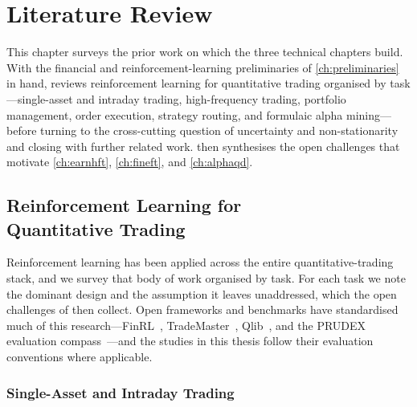 
\chapter{Literature Review} %
\label{ch:literature_review}

This chapter surveys the prior work on which the three technical chapters build. With the financial and reinforcement-learning preliminaries of \cref{ch:preliminaries} in hand,  reviews reinforcement learning for quantitative trading organised by task---single-asset and intraday trading, high-frequency trading, portfolio management, order execution, strategy routing, and formulaic alpha mining---before turning to the cross-cutting question of uncertainty and non-stationarity and closing with further related work.  then synthesises the open challenges that motivate \cref{ch:earnhft}, \cref{ch:fineft}, and \cref{ch:alphaqd}.

\section[Reinforcement Learning for Quantitative Trading]{Reinforcement Learning for\\Quantitative Trading}
\label{sec:bg_rl4qt}

Reinforcement learning has been applied across the entire quantitative-trading stack, and we survey that body of work organised by task. For each task we note the dominant design and the assumption it leaves unaddressed, which the open challenges of  then collect. Open frameworks and benchmarks have standardised much of this research---FinRL~\cite{liu2021finrl}, TradeMaster~\cite{sun2024trademaster}, Qlib~\cite{yang2020qlib}, and the PRUDEX evaluation compass~\cite{sun2023prudex}---and the studies in this thesis follow their evaluation conventions where applicable.

\subsection{Single-Asset and Intraday Trading}
\label{sec:bg_intraday}

